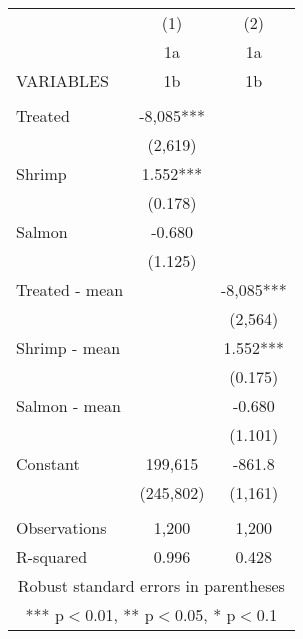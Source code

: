 \begin{tabular}{lcc} \hline
 & (1) & (2) \\
 & 1a & 1a \\
VARIABLES & 1b & 1b \\ \hline
 &  &  \\
Treated & -8,085*** &  \\
 & (2,619) &  \\
Shrimp & 1.552*** &  \\
 & (0.178) &  \\
Salmon & -0.680 &  \\
 & (1.125) &  \\
Treated - mean &  & -8,085*** \\
 &  & (2,564) \\
Shrimp - mean &  & 1.552*** \\
 &  & (0.175) \\
Salmon - mean &  & -0.680 \\
 &  & (1.101) \\
Constant & 199,615 & -861.8 \\
 & (245,802) & (1,161) \\
 &  &  \\
Observations & 1,200 & 1,200 \\
 R-squared & 0.996 & 0.428 \\ \hline
\multicolumn{3}{c}{ Robust standard errors in parentheses} \\
\multicolumn{3}{c}{ *** p$<$0.01, ** p$<$0.05, * p$<$0.1} \\
\end{tabular}
